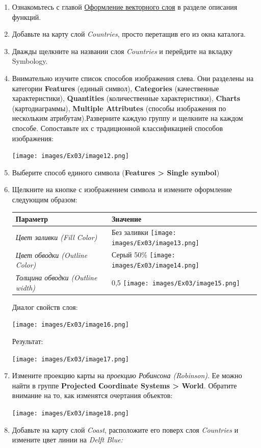 \documentclass[12pt,]{book}
\begin{document}
\begin{enumerate}
\def\labelenumi{\arabic{enumi}.}
\item
  Ознакомьтесь с главой \protect\hyperlink{manual-vector}{Оформление векторного слоя} в разделе описания функций.
\item
  Добавьте на карту слой \emph{Countries}, просто перетащив его из окна каталога.
\item
  Дважды щелкните на названии слоя \emph{Countries} и перейдите на вкладку Symbology.
\item
  Внимательно изучите список способов изображения слева. Они разделены на категории \textbf{Features} (единый символ), \textbf{Categories} (качественные характеристики), \textbf{Quantities} (количественные характеристики), \textbf{Charts} (картодиаграммы), \textbf{Multiple Attributes} (способы изображения по нескольким атрибутам).Разверните каждую группу и щелкните на каждом способе. Сопоставьте их с традиционной классификацией способов изображения:

  \texttt{[image: images/Ex03/image12.png]}
\item
  Выберите способ единого символа (\textbf{Features \textgreater{} Single symbol})
\item
  Щелкните на кнопке с изображением символа и измените оформление следующим образом:

  \begin{longtable}[]{@{}ll@{}}
  \toprule
  \textbf{Параметр} & \textbf{Значение}\tabularnewline
  \midrule
  \endhead
  \emph{Цвет заливки (Fill Color)} & Без заливки \texttt{[image: images/Ex03/image13.png]}\tabularnewline
  \emph{Цвет обводки (Outline Color)} & Серый 50\% \texttt{[image: images/Ex03/image14.png]}\tabularnewline
  \emph{Толщина обводки (Outline width)} & 0,5 \texttt{[image: images/Ex03/image15.png]}\tabularnewline
  \bottomrule
  \end{longtable}

  Диалог свойств слоя:

  \texttt{[image: images/Ex03/image16.png]}

  Результат:

  \texttt{[image: images/Ex03/image17.png]}
\item
  Измените проекцию карты на \emph{проекцию Робинсона (Robinson)}. Ее можно найти в группе \textbf{Projected Сoordinate Systems \textgreater{} World}. Обратите внимание на то, как изменятся очертания объектов:

  \texttt{[image: images/Ex03/image18.png]}
\item
  Добавьте на карту слой \emph{Coast}, расположите его поверх слоя \emph{Countries} и измените цвет линии на \emph{Delft Blue:}


\end{enumerate}
\end{document}
